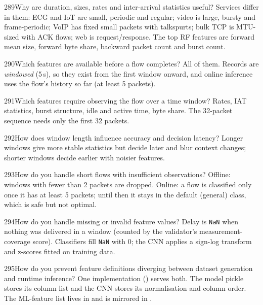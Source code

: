 \begin{qa}{289}{Why are duration, sizes, rates and inter-arrival statistics useful?}
Services differ in them: ECG and IoT are small, periodic and regular; video is large, bursty and frame-periodic;
VoIP has fixed small packets with talkspurts; bulk TCP is MTU-sized with ACK flows; web is request/response. The top RF
features are forward mean size, forward byte share, backward packet count and burst count.
\end{qa}

\begin{qa}{290}{Which features are available before a flow completes?}
All of them. Records are \emph{windowed} (5\,s), so they exist from the first window onward, and online inference uses
the flow's history so far (at least 5 packets).
\end{qa}

\begin{qa}{291}{Which features require observing the flow over a time window?}
Rates, IAT statistics, burst structure, idle and active time, byte share. The 32-packet sequence needs only the first
32 packets.
\end{qa}

\begin{qa}{292}{How does window length influence accuracy and decision latency?}
Longer windows give more stable statistics but decide later and blur context changes; shorter windows decide earlier
with noisier features.
\end{qa}

\begin{qa}{293}{How do you handle short flows with insufficient observations?}
Offline: windows with fewer than 2 packets are dropped. Online: a flow is classified only once it has at least 5
packets; until then it stays in the default (general) class, which is safe but not optimal.
\end{qa}

\begin{qa}{294}{How do you handle missing or invalid feature values?}
Delay is \texttt{NaN} when nothing was delivered in a window (counted by the validator's measurement-coverage score).
Classifiers fill \texttt{NaN} with 0; the CNN applies a sign-log transform and z-scores fitted on training data.
\end{qa}

\begin{qa}{295}{How do you prevent feature definitions diverging between dataset generation and runtime inference?}
One implementation () serves both. The model pickle stores its column list and the CNN stores
its normalisation and column order. The ML-feature list lives in  and is mirrored in
.
\end{qa}

